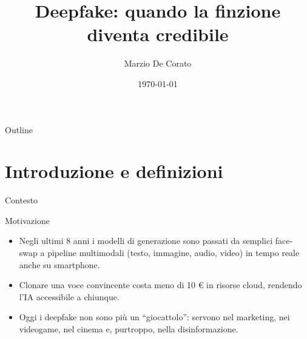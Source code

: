 \documentclass[12pt]{beamer}
\title[Deepfake & IA]{Deepfake: quando la finzione diventa credibile}
\author{Marzio De Corato}
\date{\today}
\begin{document}
\begin{frame}
  \vspace{6.5cm}\titlepage
\end{frame}
\usebackgroundtemplate{}
\begin{frame}{Outline}
  \small
    \tableofcontents
\end{frame}

\section{Introduzione e definizioni}
\begin{frame}{Contesto}
  \begin{alertblock}{Motivazione}
    \begin{itemize}
      \item Negli ultimi 8 anni i modelli di generazione sono passati da semplici face‐swap a pipeline multimodali (testo, immagine, audio, video) in tempo reale anche su smartphone.
      \item Clonare una voce convincente costa meno di 10 € in risorse cloud, rendendo l’IA accessibile a chiunque.
      \item Oggi i deepfake non sono più un “giocattolo”: servono nel marketing, nei videogame, nel cinema e, purtroppo, nella disinformazione.
    \end{itemize}
  \end{alertblock}
\end{frame}
\end{document}
